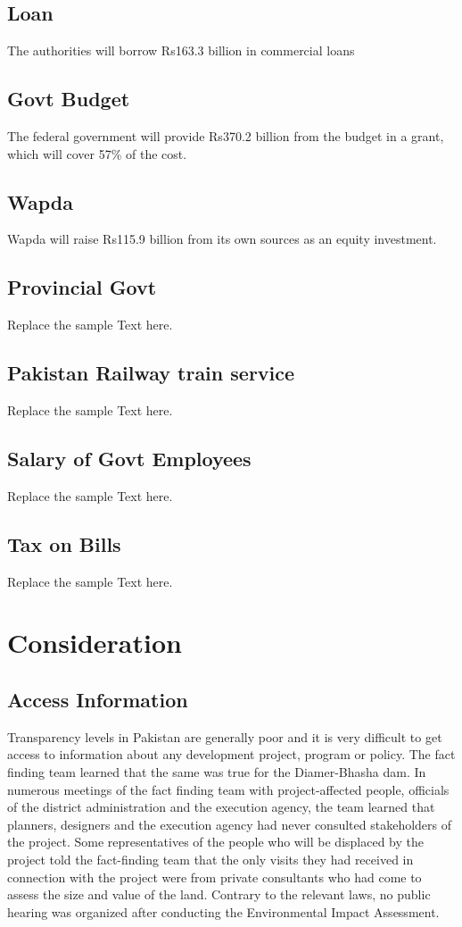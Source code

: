 \documentclass[11pt, journal,letterpaper,compsoc]{IEEEtran}
\begin{document}
\subsection{Loan}
The authorities will borrow Rs163.3 billion in commercial loans

\subsection{Govt Budget}
The federal government will provide Rs370.2 billion from the budget in a grant, which will cover 57\% of the cost. 

\subsection{Wapda}
Wapda will raise Rs115.9 billion from its own sources as an equity investment.

\subsection{Provincial Govt}
Replace the sample Text here.

\subsection{Pakistan Railway train service}
Replace the sample Text here.

\subsection{Salary of Govt Employees}
Replace the sample Text here.

\subsection{Tax on Bills}
Replace the sample Text here.
	

\section{Consideration}

\subsection{Access Information}
Transparency levels in Pakistan are generally poor and it is very difficult to get access to information about any development project, program or policy. The fact finding team learned that the same was true for the Diamer-Bhasha dam. In numerous meetings of the fact finding team with project-affected people, officials of the district administration and the execution agency, the team learned that planners, designers and the execution agency had never consulted stakeholders of the project. Some representatives of the people who will be displaced by the project told the fact-finding team that the only visits they had received in connection with the project were from private consultants who had come to assess the size and value of the land. Contrary to the relevant laws, no public hearing was organized after conducting the Environmental Impact Assessment. 
\end{document}
